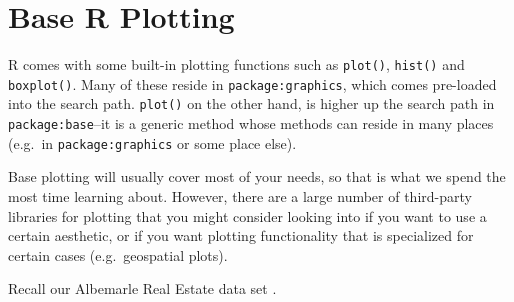 \documentclass[
  12pt,
  krantz2]{krantz}
\makeatletter
\newenvironment{Shaded}{\begin{snugshade}}{\end{snugshade}}
\newcommand{\AttributeTok}[1]{\textcolor[rgb]{0.61,0.61,0.61}{#1}}
\newcommand{\DocumentationTok}[1]{\textcolor[rgb]{0.37,0.37,0.37}{\textbf{\textit{#1}}}}
\newcommand{\FunctionTok}[1]{\textcolor[rgb]{0,0,0}{#1}}
\newcommand{\NormalTok}[1]{#1}
\newcommand{\OtherTok}[1]{\textcolor[rgb]{0.37,0.37,0.37}{#1}}
\newcommand{\StringTok}[1]{\textcolor[rgb]{0.5,0.5,0.5}{#1}}
\newenvironment{kframe}{%
\medskip{}
\setlength{\fboxsep}{.8em}
 \def\at@end@of@kframe{}%
 \ifinner\ifhmode%
  \def\at@end@of@kframe{\end{minipage}}%
  \begin{minipage}{\columnwidth}%
 \fi\fi%
 \def\FrameCommand##1{\hskip\@totalleftmargin \hskip-\fboxsep
 \colorbox{shadecolor}{##1}\hskip-\fboxsep
     \hskip-\linewidth \hskip-\@totalleftmargin \hskip\columnwidth}%
 \MakeFramed {\advance\hsize-\width
   \@totalleftmargin\z@ \linewidth\hsize
   \@setminipage}}%
 {\par\unskip\endMakeFramed%
 \at@end@of@kframe}
\renewenvironment{Shaded}{\begin{kframe}}{\end{kframe}}
\makeatother
\begin{document}
\hypertarget{base-r-plotting}{%
\section{Base R Plotting}\label{base-r-plotting}}

R comes with some built-in plotting functions such as \texttt{plot()}, \texttt{hist()} and \texttt{boxplot()}. Many of these reside in \texttt{package:graphics}, which comes pre-loaded into the search path. \texttt{plot()} on the other hand, is higher up the search path in \texttt{package:base}--it is a generic method whose methods can reside in many places (e.g.~in \texttt{package:graphics} or some place else).

Base plotting will usually cover most of your needs, so that is what we spend the most time learning about. However, there are a large number of third-party libraries for plotting that you might consider looking into if you want to use a certain aesthetic, or if you want plotting functionality that is specialized for certain cases (e.g.~geospatial plots).

Recall our Albemarle Real Estate data set \citep{albemarle_county_gis_web} \citep{clay_ford}.

\begin{Shaded}
\end{Shaded}
\end{document}

